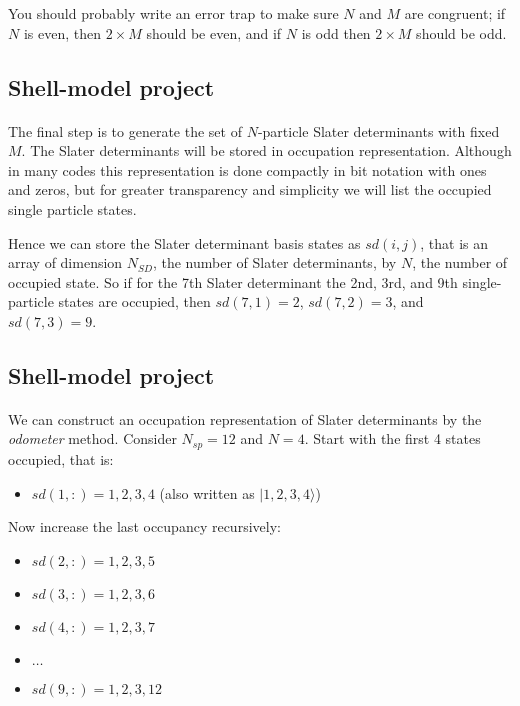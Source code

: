 You should probably write an error trap to make sure $N$ and $M$ are congruent; if $N$ is even, then 
$2 \times M$ should be even, and if $N$ is odd then $2\times M$ should be odd.



\subsection*{Shell-model project}

\paragraph{}
The final step is to generate the set of $N$-particle Slater determinants with fixed $M$. 
The Slater determinants will be stored in occupation representation.  Although in many codes
this representation is done compactly in bit notation with ones and zeros, but for 
greater transparency and simplicity we will list the occupied single particle states.

 Hence we can 
store the Slater determinant basis states as $sd(i,j)$, that is an 
array of dimension $N_{SD}$, the number of Slater determinants, by $N$, the number of occupied 
state. So if for the 7th Slater determinant the 2nd, 3rd, and 9th single-particle states are occupied, 
then $sd(7,1) = 2$, $sd(7,2) = 3$, and $sd(7,3) = 9$.



\subsection*{Shell-model project}

\paragraph{}

We can construct an occupation representation of Slater determinants by the \emph{odometer}
method.  Consider $N_{sp} = 12$ and $N=4$. 
Start with the first 4 states occupied, that is:

\begin{itemize}
\item $sd(1,:)= 1,2,3,4$ (also written as $|1,2,3,4 \rangle$)
\end{itemize}

\noindent
Now increase the last occupancy recursively:
\begin{itemize}
\item $sd(2,:)= 1,2,3,5$

\item $sd(3,:)= 1,2,3,6$

\item $sd(4,:)= 1,2,3,7$

\item $\ldots$

\item $sd(9,:)= 1,2,3,12$
\end{itemize}

